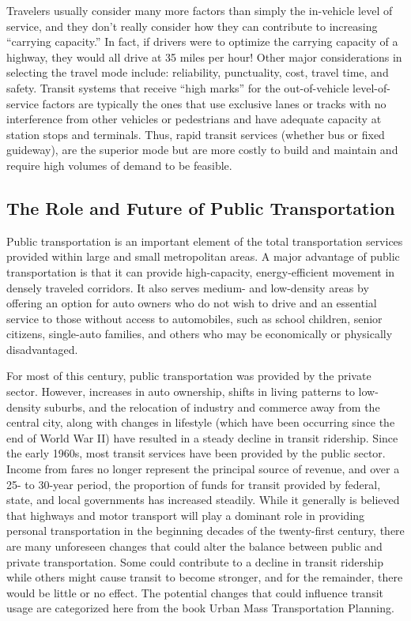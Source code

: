 \par
Travelers usually consider many more factors than simply the in-vehicle level of
service, and they don’t really consider how they can contribute to increasing “carrying capacity.” In fact, if drivers were to optimize the carrying capacity of a highway, they would all drive at 35 miles per hour! Other major considerations in selecting the travel mode include: reliability, punctuality, cost, travel time, and safety. Transit systems that receive “high marks” for the out-of-vehicle level-of-service factors are typically the ones that use exclusive lanes or tracks with no interference from other vehicles or pedestrians and have adequate capacity at station stops and terminals. Thus, rapid transit services (whether bus or fixed guideway), are the superior mode but are more costly to build and maintain and require high volumes of demand to be feasible.
%
\subsection{The Role and Future of Public Transportation}
Public transportation is an important element of the total transportation services provided within large and small metropolitan areas. A major advantage of public transportation is that it can provide high-capacity, energy-efficient movement in densely traveled corridors. It also serves medium- and low-density areas by offering an option for auto owners who do not wish to drive and an essential service to those without access to automobiles, such as school children, senior citizens, single-auto families, and others who may be economically or physically disadvantaged.\\
\par
For most of this century, public transportation was provided by the private sector.
However, increases in auto ownership, shifts in living patterns to low-density suburbs, and the relocation of industry and commerce away from the central city, along with changes in lifestyle (which have been occurring since the end of World War II) have resulted in a steady decline in transit ridership. Since the early 1960s, most transit services have been provided by the public sector. Income from fares no longer represent the principal source of revenue, and over a 25- to 30-year period, the proportion of funds for transit provided by federal, state, and local governments has increased steadily. While it generally is believed that highways and motor transport will play a dominant role in providing personal transportation in the beginning decades of the twenty-first century, there are many unforeseen changes that could alter the balance between public and private transportation. Some could contribute to a decline in transit ridership while others might cause transit to become stronger, and for the remainder, there would be little or no effect. The potential changes that could influence transit usage are categorized here from the book Urban Mass Transportation Planning.
%
